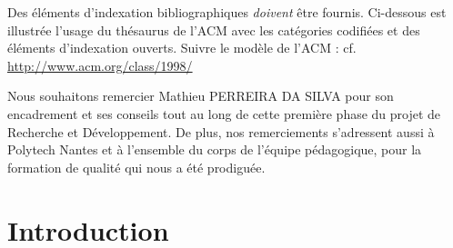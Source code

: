 \documentclass[11pt, french]{report-rd-info}
\begin{document}
\begin{classification}
   Des éléments d'indexation bibliographiques \emph{doivent} être fournis. Ci-dessous est illustrée l'usage du thésaurus de l'ACM avec les catégories codifiées et des éléments d'indexation ouverts.
   Suivre le modèle de l'ACM : cf. \url{http://www.acm.org/class/1998/}

\end{classification}

\maketitle


\begin{acknowledgements}
Nous souhaitons remercier Mathieu PERREIRA DA SILVA pour son encadrement et ses conseils tout au long de cette première phase du projet de Recherche et Développement.
De plus, nos remerciements s'adressent aussi à Polytech Nantes et à l'ensemble du corps de l'équipe pédagogique, pour la formation de qualité qui nous a été prodiguée.

\end{acknowledgements}


\newpage

\tableofcontents


\chapter{Introduction}
\end{document}
